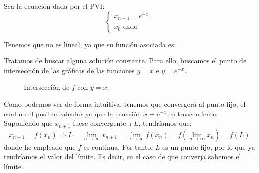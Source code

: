 \begin{ejemplo}
    Sea la ecuación dada por el PVI:
    \begin{equation*}
    \left\{ \begin{array}{l}
        x_{n+1} = e^{-x_n} \\
        x_0 \text{\ dado}
    \end{array}\right.
    \end{equation*}

    Tenemos que no es lineal, ya que su función asociada es:

    Tratamos de buscar alguna solución constante. Para ello, buscamos el punto de intersección de las gráficas de las funciones $y = x$ e $y = e^{-x}$.
    \begin{figure}[H]
        \centering
        \caption{Intersección de $f$ con $y=x$.}
    \end{figure}

    Como podemos ver de forma intuitiva, tenemos que convergerá al punto fijo, el cual no el posible calcular ya que la ecuación $x=e^{-x}$ es trascendente. Suponiendo que $x_{n+1}$ fuese convergente a $L$, tendríamos que:
    \begin{equation*}
        x_{n+1} = f(x_n)
        \Longrightarrow
        L = \lim_{n\to \infty} x_{n+1} 
        = \lim_{n\to \infty}
        f(x_n) = f\left(\lim_{n\to \infty}x_n\right) = f(L)
    \end{equation*}
    donde he empleado que $f$ es continua. Por tanto, $L$ es un punto fijo, por lo que ya tendríamos el valor del límite. Es decir, en el caso de que converja sabemos el límite.\\


\end{ejemplo}
